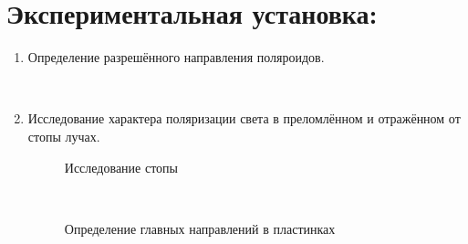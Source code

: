 \section*{Экспериментальная установка:}
\begin{enumerate}
    \item Определение разрешённого направления поляроидов.
    \begin{figure}[h!]
        \noindent{}
        \caption{}
    \end{figure} \\
    
    \item Исследование характера поляризации света в преломлённом и отражённом от стопы лучах.
    \begin{figure}[h!]
        \noindent{}
        \caption{Исследование стопы}
    \end{figure} \\
    
    \begin{figure}[h!]
        \noindent{}
        \caption{Определение главных направлений в пластинках}
    \end{figure}  
    

\end{enumerate}
